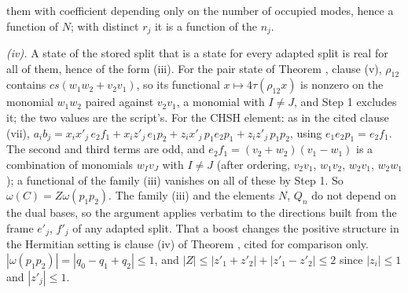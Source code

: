 them with coefficient depending only on the number of occupied modes, hence a function of $N$; with distinct $r_{j}$ it is a function of the $n_{j}$.

\emph{(iv).} A state of the stored split that is a state for every adapted split is real for all of them, hence of the form (iii). For the pair state of Theorem , clause (v), $\rho_{12}$ contains $cs(w_{1}w_{2} + v_{2}v_{1})$, so its functional $x \mapsto 4\tau(\rho_{12}x)$ is nonzero on the monomial $w_{1}w_{2}$ paired against $v_{2}v_{1}$, a monomial with $I \ne J$, and Step 1 excludes it; the two values are the script's. For the CHSH element: as in the cited clause (vii), $a_{i}b_{j} = x_{i}x'_{j}\,e_{2}f_{1} + x_{i}z'_{j}\,e_{1}p_{2} + z_{i}x'_{j}\,p_{1}e_{2}p_{1} + z_{i}z'_{j}\,p_{1}p_{2}$, using $e_{1}e_{2}p_{1} = e_{2}f_{1}$. The second and third terms are odd, and $e_{2}f_{1} = (v_{2} + w_{2})(v_{1} - w_{1})$ is a combination of monomials $w_{I}v_{J}$ with $I \ne J$ (after ordering, $v_{2}v_{1}$, $w_{1}v_{2}$, $w_{2}v_{1}$, $w_{2}w_{1}$); a functional of the family (iii) vanishes on all of these by Step 1. So $\omega(C) = Z\omega(p_{1}p_{2})$. The family (iii) and the elements $N$, $Q_{n}$ do not depend on the dual bases, so the argument applies verbatim to the directions built from the frame $e'_{j}$, $f'_{j}$ of any adapted split. That a boost changes the positive structure in the Hermitian setting is clause (iv) of Theorem , cited for comparison only. $|\omega(p_{1}p_{2})| = |q_{0} - q_{1} + q_{2}| \le 1$, and $|Z| \le |z'_{1} + z'_{2}| + |z'_{1} - z'_{2}| \le 2$ since $|z_{i}| \le 1$ and $|z'_{j}| \le 1$.
